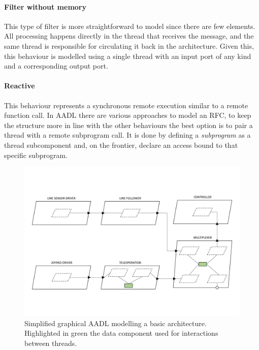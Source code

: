 \paragraph{Filter without memory} This type of filter is more straightforward to model since there are few elements. All processing happens directly in the thread that receives the message, and the same thread is responsible for circulating it back in the architecture. Given this, this behaviour is modelled using a single thread with an input port of any kind and a corresponding output port.
\paragraph{Reactive} This behaviour represents a synchronous remote execution similar to a remote function call. In AADL there are various approaches to model an RFC, to keep the structure more in line with the other behaviours the best option is to pair a thread with a remote subprogram call. It is done by defining a \textit{subprogram} as a thread subcomponent and, on the frontier, declare an access bound to that specific subprogram.

\begin{landscape}
	\begin{figure}[t]
	\centering
	\includegraphics[height=0.88\textwidth]{gfx/arch_figures-25}
	\caption[Simplified graphical AADL modelling a basic architecture.]{Simplified graphical AADL modelling a basic architecture. Highlighted in green the data component used for interactions between threads.}
	\label{fig:cnc-arch}
	\end{figure}
\end{landscape}


